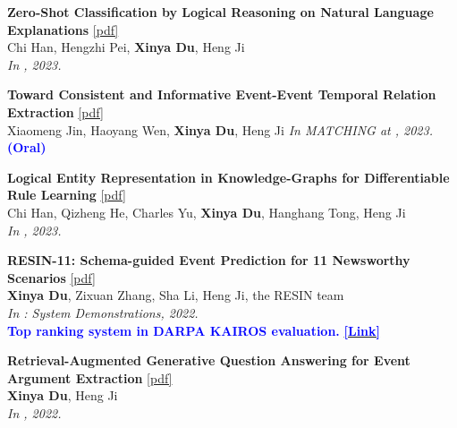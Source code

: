 \begin{enumerate}[{[}1{]},leftmargin=*]
\parbox{\textwidth}{
\item 
{\bf Zero-Shot Classification by Logical Reasoning on Natural Language Explanations} 
\href{https://aclanthology.org/2023.findings-acl.571.pdf}{{[pdf]}} \\
Chi Han, Hengzhi Pei, \textbf{Xinya Du}, Heng Ji \\
{\it In \ACLfinding, 2023.}\\
}

\item 
{\bf Toward Consistent and Informative Event-Event Temporal Relation Extraction} 
\href{https://aclanthology.org/2023.matching-1.3.pdf}{{[pdf]}} \\
Xiaomeng Jin, Haoyang Wen, \textbf{Xinya Du}, Heng Ji
{\it In MATCHING at \ACL, 2023.} {\textcolor{blue}{\textbf{(Oral)}}} \\ 

\parbox{\textwidth}{
\item 
{\bf Logical Entity Representation in Knowledge-Graphs for Differentiable Rule Learning} 
\href{https://openreview.net/pdf?id=JdgO-ht1uTN}{{[pdf]}} \\
Chi Han, Qizheng He, Charles Yu, \textbf{Xinya Du}, Hanghang Tong, Heng Ji\\
{\it In \ICLR, 2023.}\\
}

\parbox{\textwidth}{
\item
{\bf RESIN-11: Schema-guided Event Prediction for 11 Newsworthy Scenarios} 
\href{https://aclanthology.org/2022.naacl-demo.7.pdf}{{[pdf]}} \\
{\bf Xinya Du}, Zixuan Zhang, Sha Li, Heng Ji, the RESIN team \\
{\it In \NAACL: System Demonstrations, 2022.} \\
{\textcolor{blue}{\textbf{Top ranking system in DARPA KAIROS evaluation.}}} 
\href{https://www.darpa.mil/program/knowledge-directed-artificial-intelligence-reasoning-over-schemas}{\textcolor{blue}{\textbf{[Link]}}} \\ 
}

\item 
{\bf Retrieval-Augmented Generative Question Answering for Event Argument Extraction} 
\href{https://aclanthology.org/2022.emnlp-main.307.pdf}{{[pdf]}} \\
{\bf Xinya Du}, Heng Ji \\
{\it In \EMNLP, 2022.}\\


\end{enumerate}
